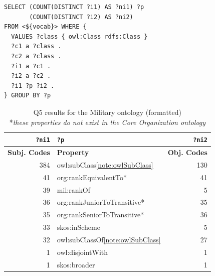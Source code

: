 \begin{lstlisting}[captionpos=b, caption=Q5 -- Query to get a list of properties that connect class instances (also shows the number of instances on both sides),label=lst:sparql5,basicstyle=\small\ttfamily,frame=single]
SELECT (COUNT(DISTINCT ?i1) AS ?ni1) ?p 
       (COUNT(DISTINCT ?i2) AS ?ni2)
FROM <${vocab}> WHERE {
  VALUES ?class { owl:Class rdfs:Class }
  ?c1 a ?class .
  ?c2 a ?class .
  ?i1 a ?c1 .
  ?i2 a ?c2 .
  ?i1 ?p ?i2 .
} GROUP BY ?p
\end{lstlisting}


\begin{table}[h]
\footnotesize
\centering
\begin{tabular}{|r|l|r|}
\hline
\textbf{\texttt{?ni1}}     & \textbf{\texttt{?p}}                  & \textbf{\texttt{?ni2}} \\ \hline \hline
\textbf{Subj. Codes}       & \textbf{Property}                     & \textbf{Obj. Codes}    \\ \hline
384                        & owl:subClass\cref{note:owlSubClass}   & 130                    \\ \hline
41                         & org:rankEquivalentTo*                 & 41                     \\ \hline
39                         & mil:rankOf                            & 5                      \\ \hline
36                         & org:rankJuniorToTransitive*           & 35                     \\ \hline
35                         & org:rankSeniorToTransitive*           & 36                     \\ \hline
33                         & skos:inScheme                         & 5                      \\ \hline
32                         & owl:subClassOf\cref{note:owlSubClass} & 27                     \\ \hline
1                          & owl:disjointWith                      & 1                      \\ \hline
1                          & skos:broader                          & 1                      \\ \hline
\end{tabular}
\footnotesize
\caption{Q5 results for the Military ontology (formatted)\\ \**\textit{these properties do not exist in the Core Organization ontology}} \label{tab:q5-results}
\end{table}


